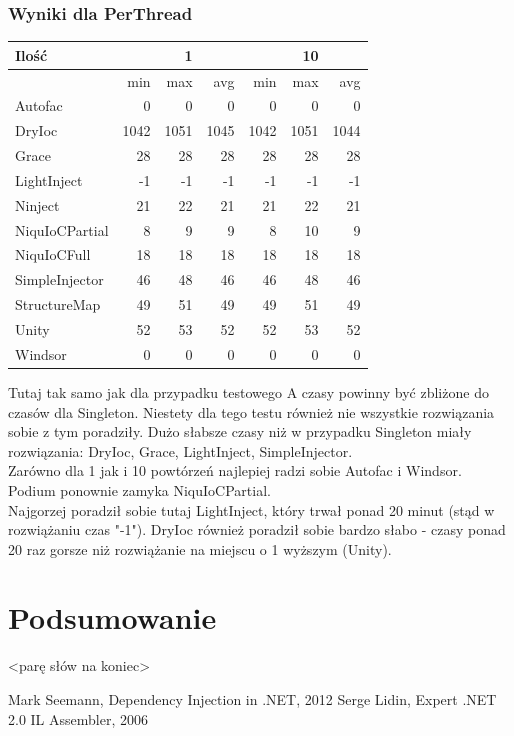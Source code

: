 \documentclass[12pt]{article}
\begin{document}
\subsubsection{Wyniki dla PerThread}
\begin{center}
\begin{small}
	\begin{tabular}{ | l | r r r | r r r | }
    		\hline
Ilość & & 1 & & & 10 & \\ \hline
 & min & max & avg & min & max & avg \\ \hline
Autofac & 0 & 0 & 0 & 0 & 0 & 0 \\ \hline
DryIoc & 1042 & 1051 & 1045 & 1042 & 1051 & 1044 \\ \hline
Grace & 28 & 28 & 28 & 28 & 28 & 28 \\ \hline
LightInject & -1 & -1 & -1 & -1 & -1 & -1 \\ \hline
Ninject & 21 & 22 & 21 & 21 & 22 & 21 \\ \hline
NiquIoCPartial & 8 & 9 & 9 & 8 & 10 & 9 \\ \hline
NiquIoCFull & 18 & 18 & 18 & 18 & 18 & 18 \\ \hline
SimpleInjector & 46 & 48 & 46 & 46 & 48 & 46 \\ \hline
StructureMap & 49 & 51 & 49 & 49 & 51 & 49 \\ \hline
Unity & 52 & 53 & 52 & 52 & 53 & 52 \\ \hline
Windsor & 0 & 0 & 0 & 0 & 0 & 0 \\ \hline
  	\end{tabular}
\end{small}
\end{center}
Tutaj tak samo jak dla przypadku testowego A czasy powinny być zbliżone do czasów dla Singleton. Niestety dla tego testu również nie wszystkie rozwiązania sobie z tym poradziły. Dużo słabsze czasy niż w przypadku Singleton miały rozwiązania: DryIoc, Grace, LightInject, SimpleInjector.\\
Zarówno dla 1 jak i 10 powtórzeń najlepiej radzi sobie Autofac i Windsor. Podium ponownie zamyka NiquIoCPartial.\\
Najgorzej poradził sobie tutaj LightInject, który trwał ponad 20 minut (stąd w rozwiążaniu czas "-1"). DryIoc również poradził sobie bardzo słabo - czasy ponad 20 raz gorsze niż rozwiążanie na miejscu o 1 wyższym (Unity).


\clearpage

\section{Podsumowanie}
<parę słów na koniec>

\newpage
\begin{thebibliography}{authordate1}
 Mark Seemann, Dependency Injection in .NET, 2012
 Serge Lidin, Expert .NET 2.0 IL Assembler, 2006
\end{thebibliography}
\end{document}
